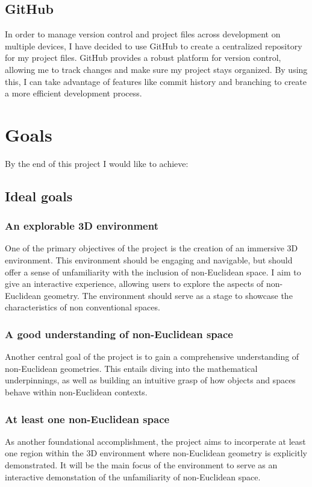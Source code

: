 \documentclass[]{article}
\begin{document}
            \subsection{GitHub}
                In order to manage version control and project files across development on multiple devices, I have decided to use GitHub 
                to create a centralized repository for my project files. GitHub provides a robust platform for version control, allowing me to track 
                changes and make sure my project stays organized. By using this, I can take advantage of features like commit 
                history and branching to create a more efficient development process.
    
    \newpage
    \section{Goals}
        By the end of this project I would like to achieve:
        \subsection{Ideal goals}
        \subsubsection{An explorable 3D environment}
            One of the primary objectives of the project is the creation of an immersive 3D environment. 
            This environment should be engaging and navigable, but should offer a sense of unfamiliarity with the  
            inclusion of non-Euclidean space. I aim to give an interactive experience, allowing users to explore the aspects 
            of non-Euclidean geometry. The environment should serve as a stage to showcase the characteristics of non conventional 
            spaces.
        \subsubsection{A good understanding of non-Euclidean space}
            Another central goal of the project is to gain a comprehensive understanding of non-Euclidean 
            geometries. This entails diving into the mathematical underpinnings, as well as building an intuitive grasp of how 
            objects and spaces behave within non-Euclidean contexts.
        \subsubsection{At least one non-Euclidean space}
            As another foundational accomplishment, the project aims to incorperate at least one region within the 
            3D environment where non-Euclidean geometry is explicitly demonstrated. It will be the main focus of the environment to 
            serve as an interactive demonstation of the unfamiliarity of non-Euclidean space.
\end{document}
